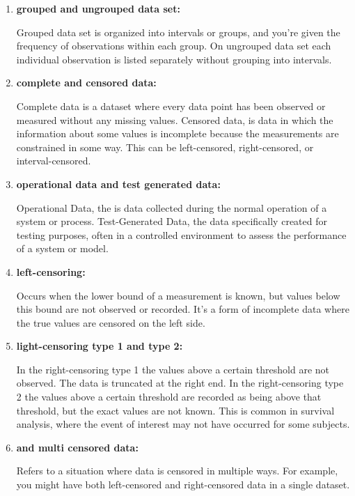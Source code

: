 \documentclass{article}
\begin{document}
\begin{enumerate}[label=(\alph*)]
    \item \textbf{grouped and ungrouped data set:} 
    
        Grouped data set is organized into intervals or groups, and you're given the frequency of observations within each group. On ungrouped data set each individual observation is listed separately without grouping into intervals.
           
    \item \textbf{complete and censored data:}
    
        Complete data is a dataset where every data point has been observed or measured without any missing values.
        Censored data, is data in which the information about some values is incomplete because the measurements are constrained in some way. This can be left-censored, right-censored, or interval-censored.
        
    \item \textbf{operational data and test generated data:}
    
        Operational Data, the is data collected during the normal operation of a system or process.
        Test-Generated Data, the data specifically created for testing purposes, often in a controlled environment to assess the performance of a system or model.
    \item \textbf{left-censoring:}
    
        Occurs when the lower bound of a measurement is known, but values below this bound are not observed or recorded. It's a form of incomplete data where the true values are censored on the left side.
        
    \item \textbf{light-censoring type 1 and type 2:}
    
       In the right-censoring type 1 the values above a certain threshold are not observed. The data is truncated at the right end.
       In the right-censoring type 2 the values above a certain threshold are recorded as being above that threshold, but the exact values are not known. This is common in survival analysis, where the event of interest may not have occurred for some subjects.
        
    \item \textbf{and multi censored data:}
    
        Refers to a situation where data is censored in multiple ways. For example, you might have both left-censored and right-censored data in a single dataset.
\end{enumerate}
\end{document}
